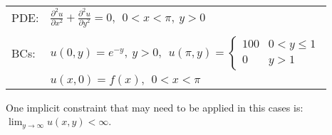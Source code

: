 \begin{table}
\begin{tabular}{l l}
PDE: & $\frac{\partial^2 u}{\partial x^2} + \frac{\partial^2 u}{\partial y^2} = 0, \ \ 0<x<\pi, \ y>0 $ \\
& \\
BCs: & $u(0,y) = e^{-y}, \ y>0, \ \ u(\pi,y) = \begin{cases} 100 & 0 < y \le 1 \\ 0 & y>1 \end{cases} $ \\
& $u(x,0) = f(x), \ \ 0<x<\pi $\\
\end{tabular}
\end{table}
One implicit constraint that may need to be applied in this cases is: $\lim_{y \to \infty} u(x,y) < \infty$. 
